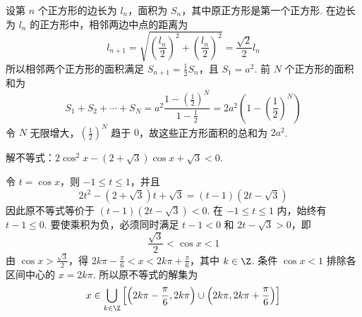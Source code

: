 \begin{solution}
设第 \(n\) 个正方形的边长为 \(l_n\)，面积为 \(S_n\)，其中原正方形是第一个正方形. 在边长为 \(l_n\) 的正方形中，相邻两边中点的距离为
\[
l_{n+1}=\sqrt{\left(\frac{l_n}{2}\right)^2+\left(\frac{l_n}{2}\right)^2}=\frac{\sqrt2}{2}l_n
\]
所以相邻两个正方形的面积满足 \(S_{n+1}=\frac12S_n\)，且 \(S_1=a^2\). 前 \(N\) 个正方形的面积和为
\[
S_1+S_2+\cdots+S_N=a^2\frac{1-\left(\frac12\right)^N}{1-\frac12}=2a^2\left(1-\left(\frac12\right)^N\right)
\]
令 \(N\) 无限增大，\(\left(\frac12\right)^N\) 趋于 \(0\)，故这些正方形面积的总和为 \(2a^2\).
\end{solution}

\begin{problem}
解不等式：\(2\cos^2x-\left(2+\sqrt3\right)\cos x+\sqrt3<0\).
\end{problem}

\begin{solution}
令 \(t=\cos x\)，则 \(-1\le t\le1\)，并且
\[
2t^2-\left(2+\sqrt3\right)t+\sqrt3=(t-1)(2t-\sqrt3)
\]
因此原不等式等价于 \(\left(t-1\right)\left(2t-\sqrt3\right)<0\). 在 \(-1\le t\le1\) 内，始终有 \(t-1\le0\). 要使乘积为负，必须同时满足 \(t-1<0\) 和 \(2t-\sqrt3>0\)，即
\[
\frac{\sqrt3}{2}<\cos x<1
\]
由 \(\cos x>\frac{\sqrt3}{2}\)，得 \(2k\pi-\frac\pi6<x<2k\pi+\frac\pi6\)，其中 \(k\in\Z\). 条件 \(\cos x<1\) 排除各区间中心的 \(x=2k\pi\). 所以原不等式的解集为
\[
x\in\bigcup_{k\in\Z}\left[\left(2k\pi-\frac\pi6,2k\pi\right)\cup\left(2k\pi,2k\pi+\frac\pi6\right)\right]
\]
\end{solution}
